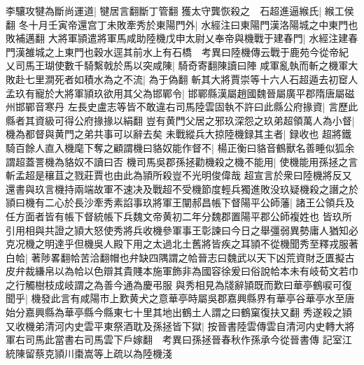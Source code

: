 李驤攻犍為斷尚運道|{
	犍居言翻斷丁管翻}
獲太守龔恢殺之　石超進逼緱氏|{
	緱工侯翻}
冬十月壬寅帝還宫丁未敗牽秀於東陽門外|{
	水經注曰東陽門漢洛陽城之中東門也敗補邁翻}
大將軍頴遣將軍馬咸助陸機戊申太尉乂奉帝與機戰于建春門|{
	水經注建春門漢雒城之上東門也穀水逕其前水上有石橋　考異曰陸機傳云戰于鹿苑今從帝紀}
乂司馬王瑚使數千騎繫戟於馬以突咸陳|{
	騎奇寄翻陳讀曰陣}
咸軍亂執而斬之機軍大敗赴七里澗死者如積水為之不流|{
	為于偽翻}
斬其大將賈崇等十六人石超遁去初䆠人孟玖有寵於大將軍頴玖欲用其父為邯鄲令|{
	邯鄲縣漢屬趙國魏晉屬廣平郡隋唐屬磁州邯鄲音寒丹}
左長史盧志等皆不敢違右司馬陸雲固執不許曰此縣公府掾資|{
	言歷此縣者其資級可得公府掾掾以絹翻}
豈有黄門父居之邪玖深怨之玖弟超領萬人為小督|{
	機為都督與黄門之弟共事可以辭去矣}
未戰縱兵大掠陸機録其主者|{
	録收也}
超將鐵騎百餘人直入機麾下奪之顧謂機曰貉奴能作督不|{
	楊正衡曰貉音鶴獸名善睡似狐余謂超蓋詈機為貉奴不讀曰否}
機司馬吳郡孫拯勸機殺之機不能用|{
	使機能用孫拯之言斬孟超是穰苴之戮莊賈也由此為頴所殺豈不光明俊偉哉}
超宣言於衆曰陸機將反又還書與玖言機持兩端故軍不速决及戰超不受機節度輕兵獨進敗没玖疑機殺之譖之於頴曰機有二心於長沙牽秀素諂事玖將軍王闡郝昌帳下督陽平公師藩|{
	諸王公領兵及任方面者皆有帳下督統帳下兵魏文帝黄初二年分魏郡置陽平郡公師複姓也}
皆玖所引用相與共證之頴大怒使秀將兵收機參軍事王彰諫曰今日之舉彊弱異勢庸人猶知必克况機之明達乎但機吳人殿下用之太過北土舊將皆疾之耳頴不從機聞秀至釋戎服著白帢|{
	著陟畧翻帢苦洽翻帽也弁缺四隅謂之帢晉志曰魏武以天下凶荒資財乏匱擬古皮弁裁縑帛以為帢以色辯其貴賤本施軍飾非為國容徐爰曰俗說帢本未有岐荀文若巾之行觸樹枝成岐謂之為善今通為慶弔服}
與秀相見為牋辭頴既而歎曰華亭鶴唳可復聞乎|{
	機發此言有咸陽市上歎黄犬之意華亭時屬吳郡嘉興縣界有華亭谷華亭水至唐始分嘉興縣為華亭縣今縣東七十里其地出鶴土人謂之曰鶴窠復扶又翻}
秀遂殺之頴又收機弟清河内史雲平東祭酒耽及孫拯皆下獄|{
	按晉書陸雲傳雲自清河内史轉大將軍右司馬此當書右司馬雲下戶嫁翻　考異曰孫拯晉春秋作孫承今從晉書傳}
記室江統陳留蔡克頴川棗嵩等上疏以為陸機淺

